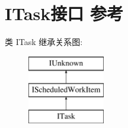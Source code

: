 \hypertarget{interface_i_task}{}\section{I\+Task接口 参考}
\label{interface_i_task}
类 I\+Task 继承关系图\+:\begin{figure}[H]
\begin{center}
\leavevmode
\includegraphics[height=3.000000cm]{interface_i_task}
\end{center}
\end{figure}

